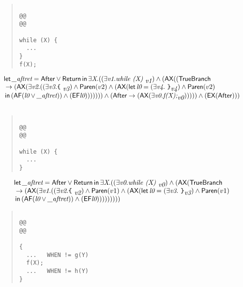 \documentclass{article}
\newcommand{\AX}{\mbox{\sf{AX}}}
\newcommand{\EX}{\mbox{\sf{EX}}}
\newcommand{\AF}{\mbox{\sf{AF}}}
\newcommand{\EF}{\mbox{\sf{EF}}}
\newcommand{\mita}[1]{\mbox{\it{{#1}}}}
\newcommand{\msf}[1]{\mbox{\sf{{#1}}}}
\newcommand{\ttlb}{\mbox{\tt \char'173}}
\newcommand{\ttrb}{\mbox{\tt \char'175}}
\begin{document}
\begin{quote}\begin{verbatim}

@@
@@

while (X) {
  ...
}
f(X);
\end{verbatim}\end{quote}

\[\begin{array}{l}
\mita{\sf{let}} \, \mita{\_aftret} = \msf{After} \vee \msf{Return} \, \mita{\sf{in}} \, \exists \mita{X} . ((\exists \mita{v1} . \mita{while (X) }_{\mita{v1}}) \wedge (\AX((\msf{TrueBranch}\\\mbox{} \rightarrow (\AX(\exists \mita{v2} . ((\exists \mita{v3} . \mita{{\ttlb}
  }_{\mita{v3}}) \wedge \msf{Paren}(v2) \wedge (\AX(\mita{\sf{let}} \, \mita{l0} = (\exists \mita{v4} . \mita{
{\ttrb}}_{\mita{v4}}) \wedge \msf{Paren}(v2)\\\mbox{} \, \mita{\sf{in}} \, (\AF(\mita{l0} \vee \mita{\_aftret})) \wedge (\EF\mita{l0})
)))))) \wedge (\msf{After} \rightarrow (\AX(\exists \mita{v0} . \mita{f(X);}_{\mita{v0}}))))) \wedge (\EX(\msf{After})))\\\mbox{}

\end{array}\]

\begin{quote}\begin{verbatim}

@@
@@

while (X) {
  ...
}
\end{verbatim}\end{quote}

\[\begin{array}{l}
\mita{\sf{let}} \, \mita{\_aftret} = \msf{After} \vee \msf{Return} \, \mita{\sf{in}} \, \exists \mita{X} . ((\exists \mita{v0} . \mita{while (X) }_{\mita{v0}}) \wedge (\AX(\msf{TrueBranch}\\\mbox{} \rightarrow (\AX(\exists \mita{v1} . ((\exists \mita{v2} . \mita{{\ttlb}
  }_{\mita{v2}}) \wedge \msf{Paren}(v1) \wedge (\AX(\mita{\sf{let}} \, \mita{l0} = (\exists \mita{v3} . \mita{
{\ttrb}}_{\mita{v3}}) \wedge \msf{Paren}(v1)\\\mbox{} \, \mita{\sf{in}} \, (\AF(\mita{l0} \vee \mita{\_aftret})) \wedge (\EF\mita{l0})
))))))))

\end{array}\]

\begin{quote}\begin{verbatim}

@@
@@

{
  ...   WHEN != g(Y)
  f(X);
  ...   WHEN != h(Y)
}
\end{verbatim}\end{quote}
\end{document}
